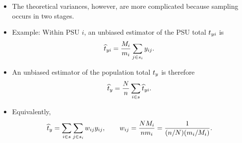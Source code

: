 \documentclass{my_eth_beamer}
\numberwithin{equation}{section}
\begin{document}
\begin{frame}
    \begin{itemize}
    \setlength{\itemsep}{8pt}
        \item The theoretical \alert{variances}, however, are more
            \alert{complicated} because sampling occurs in two stages.
        \item \alert{Example:} Within PSU $i$, an unbiased estimator of the PSU
            total $t_{yi}$ is
            \begin{equation*}
                \widehat{t}_{yi} = \frac{M_i}{m_i}\sum_{j\in s_i}y_{ij}.
            \end{equation*}
        \item An unbiased estimator of the population total $t_y$ is therefore
            \begin{equation*}
                \widehat{t}_y = \frac{N}{n}\sum_{i\in s}\widehat{t}_{yi}.
            \end{equation*}
        \item Equivalently,
            \begin{equation*}
                \widehat{t}_y = \sum_{i\in s}\sum_{j\in s_i}w_{ij}y_{ij},
                \qquad w_{ij}=\frac{N M_i}{n m_i} = \frac{1}{(n/N)(m_i/M_i)}.
            \end{equation*}
    \end{itemize}
\end{frame}
\end{document}
